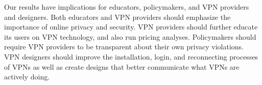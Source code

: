 Our results have implications for educators, policymakers, and VPN providers
and designers. Both educators and VPN providers should emphasize the
importance of online privacy and security. VPN providers should further
educate its users on VPN technology, and also run pricing analyses.
Policymakers should require VPN providers to be transparent about their own
privacy violations. VPN designers should improve the installation, login, and
reconnecting processes of VPNs as well as create designs that better
communicate what VPNs are actively doing.

